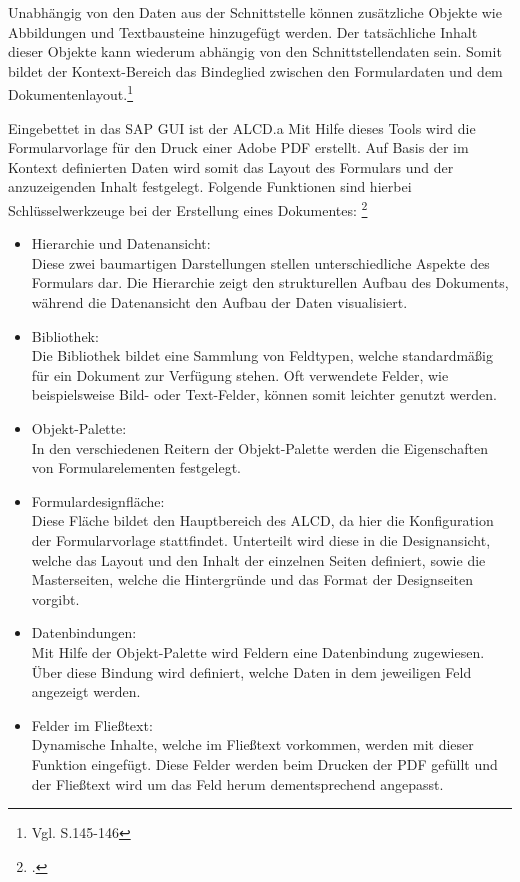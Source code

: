 Unabhängig von den Daten aus der Schnittstelle können zusätzliche Objekte wie Abbildungen und Textbausteine hinzugefügt werden. Der tatsächliche Inhalt dieser Objekte kann wiederum abhängig von den Schnittstellendaten sein. Somit bildet der Kontext-Bereich das Bindeglied zwischen den Formulardaten und dem Dokumentenlayout.\footnote{Vgl. \cite{Hauser.2015} S.145-146} 

Eingebettet in das SAP \ac{GUI} ist der \ac{ALCD}.a Mit Hilfe dieses Tools wird die Formularvorlage für den Druck einer Adobe PDF erstellt. Auf Basis der im Kontext definierten Daten wird somit das Layout des Formulars und der anzuzeigenden Inhalt festgelegt. Folgende Funktionen sind hierbei Schlüsselwerkzeuge bei der Erstellung eines Dokumentes: \footcite{Hauser.2015}

\begin{itemize}
	\item Hierarchie und Datenansicht: \\
		Diese zwei baumartigen Darstellungen stellen unterschiedliche Aspekte des Formulars dar. Die Hierarchie zeigt den strukturellen Aufbau des Dokuments, während die Datenansicht den Aufbau der Daten visualisiert.
	\item Bibliothek: \\
		Die Bibliothek bildet eine Sammlung von Feldtypen, welche standardmäßig für ein Dokument zur Verfügung stehen. Oft verwendete Felder, wie beispielsweise Bild- oder Text-Felder, können somit leichter genutzt werden.
	\item Objekt-Palette: \\
		In den verschiedenen Reitern der Objekt-Palette werden die Eigenschaften von Formularelementen festgelegt.
	\item Formulardesignfläche: \\
		Diese Fläche bildet den Hauptbereich des \ac{ALCD}, da hier die Konfiguration der Formularvorlage stattfindet. Unterteilt wird diese in die Designansicht, welche das Layout und den Inhalt der einzelnen Seiten definiert, sowie die Masterseiten, welche die Hintergründe und das Format der Designseiten vorgibt.
	\item Datenbindungen: \\
		Mit Hilfe der Objekt-Palette wird Feldern eine Datenbindung zugewiesen. Über diese Bindung wird definiert, welche Daten in dem jeweiligen Feld angezeigt werden.
	\item Felder im Fließtext: \\
		Dynamische Inhalte, welche im Fließtext vorkommen, werden mit dieser Funktion eingefügt. Diese Felder werden beim Drucken der PDF gefüllt und der Fließtext wird um das Feld herum dementsprechend angepasst.

\end{itemize}
